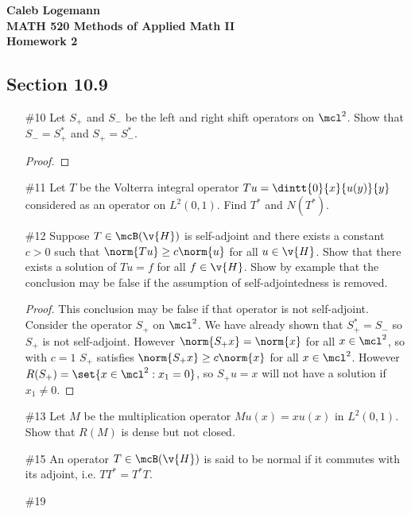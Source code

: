 \documentclass[11pt, oneside]{article}
\begin{document}
\noindent \textbf{\Large{Caleb Logemann \\
MATH 520 Methods of Applied Math II \\
Homework 2
}}

\subsection*{Section 10.9}
\begin{enumerate}
  \item[\#10]
    Let $S_+$ and $S_-$ be the left and right shift operators on $\mcl^2$.
    Show that $S_- = S_+^*$ and $S_+=S_-^*$.

    \begin{proof}
      
    \end{proof}

  \pagebreak
  \item[\#11]
    Let $T$ be the Volterra integral operator $Tu = \dintt{0}{x}{u(y)}{y}$
    considered as an operator on $L^2(0, 1)$.
    Find $T^*$ and $N(T^*)$.

  \pagebreak
  \item[\#12]
    Suppose $T \in \mcB(\v{H})$ is self-adjoint and there exists a constant
    $c > 0$ such that $\norm{Tu} \ge c \norm{u}$ for all $u \in \v{H}$.
    Show that there exists a solution of $Tu = f$ for all $f \in \v{H}$.
    Show by example that the conclusion may be false if the assumption of
    self-adjointedness is removed.

    \begin{proof}
      

      This conclusion may be false if that operator is not self-adjoint.
      Consider the operator $S_+$ on $\mcl^2$.
      We have already shown that $S_+^* = S_-$ so $S_+$ is not self-adjoint.
      However $\norm{S_+x} = \norm{x}$ for all $x \in \mcl^2$, so with $c = 1$
      $S_+$ satisfies $\norm{S_+ x} \ge c \norm{x}$ for all $x \in \mcl^2$.
      However $R(S_+) = \set{x \in \mcl^2 : x_1 = 0}$, so $S_+ u = x$ will not
      have a solution if $x_1 \neq 0$.
    \end{proof}

  \pagebreak
  \item[\#13]
    Let $M$ be the multiplication operator $Mu(x) = xu(x)$ in $L^2(0, 1)$.
    Show that $R(M)$ is dense but not closed.

  \pagebreak
  \item[\#15]
    An operator $T \in \mcB(\v{H})$ is said to be normal if it commutes with
    its adjoint, i.e. $TT^* = T^*T$.

  \pagebreak
  \item[\#19]
\end{enumerate}
\end{document}
